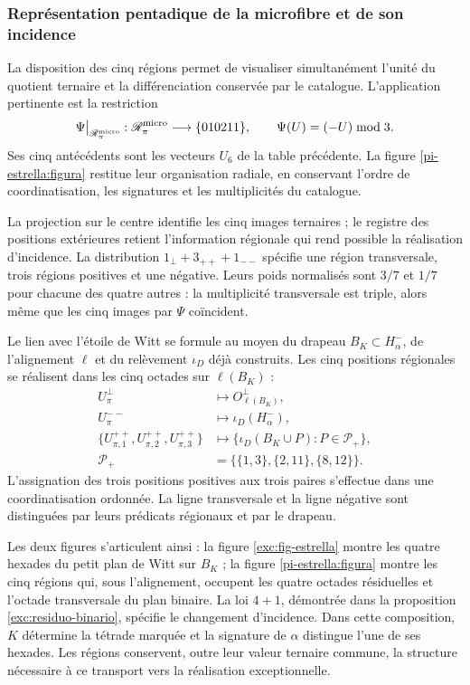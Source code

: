 \subsubsection{Représentation pentadique de la microfibre et de son incidence}
\label{pi-estrella:desarrollo}

La disposition des cinq régions permet de visualiser simultanément
l'unité du quotient ternaire et la différenciation conservée par le
catalogue. L'application pertinente est la restriction
\[
 \Psi\big|_{\mathscr R_\pi^{\rm micro}}:
 \mathscr R_\pi^{\rm micro}\longrightarrow\{010211\},
 \qquad \Psi(U)=(-U)\bmod3.
\]
Ses cinq antécédents sont les vecteurs \(U_6\) de la table précédente.
La figure \ref{pi-estrella:figura} restitue leur organisation radiale,
en conservant l'ordre de coordinatisation, les signatures et les multiplicités du
catalogue.



La projection sur le centre identifie les cinq images ternaires ; le
registre des positions extérieures retient l'information régionale
qui rend possible la réalisation d'incidence. La distribution
\(1_\perp+3_{++}+1_{--}\) spécifie une région transversale, trois
régions positives et une négative. Leurs poids normalisés sont
\(3/7\) et \(1/7\) pour chacune des quatre autres : la
multiplicité transversale est triple, alors même que les cinq images par
\(\Psi\) coïncident.

Le lien avec l'étoile de Witt se formule au moyen du drapeau
\(B_K\subset H^-_\alpha\), de l'alignement \(\ell\) et du
relèvement \(\iota_D\) déjà construits. Les cinq positions régionales
se réalisent dans les cinq octades sur \(\ell(B_K)\) :
\[
\begin{aligned}
 U_\pi^\perp&\longmapsto O^\perp_{\ell(B_K)},\\
 U_\pi^{--}&\longmapsto\iota_D(H^-_\alpha),\\
 \{U_{\pi,1}^{++},U_{\pi,2}^{++},U_{\pi,3}^{++}\}
 &\longmapsto
 \{\iota_D(B_K\cup P):P\in\mathcal P_+\},\\
 \mathcal P_+&=\bigl\{\{1,3\},\{2,11\},\{8,12\}\bigr\}.
\end{aligned}
\]
L'assignation des trois positions positives aux trois paires
s'effectue dans une coordinatisation ordonnée. La ligne transversale et la ligne négative
sont distinguées par leurs prédicats régionaux et par le drapeau.

Les deux figures s'articulent ainsi : la figure
\ref{exc:fig-estrella} montre les quatre hexades du petit plan
de Witt sur \(B_K\) ; la figure \ref{pi-estrella:figura} montre
les cinq régions qui, sous l'alignement, occupent les quatre octades
résiduelles et l'octade transversale du plan binaire. La loi
\(4+1\), démontrée dans la proposition
\ref{exc:residuo-binario}, spécifie le changement d'incidence. Dans cette
composition, \(K\) détermine la tétrade marquée et la signature de
\(\alpha\) distingue l'une de ses hexades. Les régions conservent,
outre leur valeur ternaire commune, la structure nécessaire à ce
transport vers la réalisation exceptionnelle.
